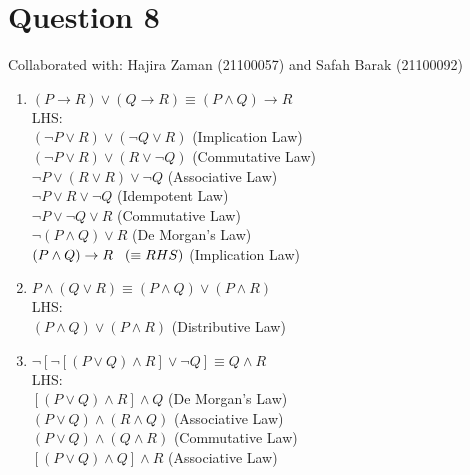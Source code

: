 \documentclass{article}
\begin{document}
\section{Question 8}
Collaborated with: Hajira Zaman (21100057) and Safah Barak (21100092)
\begin{enumerate}
\item %
$(P \rightarrow R) \vee (Q \rightarrow R) \equiv (P\wedge Q) \rightarrow R$ \\
LHS: \\
$(\lnot P \vee R) \vee (\lnot Q \vee R)$ \hspace{10mm} (Implication Law) \\
$(\lnot P \vee R) \vee (R \vee \lnot Q )$ \hspace{10mm} (Commutative Law)\\
$\lnot P \vee ( R \vee R) \vee \lnot Q$ \hspace{13mm} (Associative Law)\\
$\lnot P \vee  R  \vee \lnot Q$ \hspace{22mm} (Idempotent Law)\\
$\lnot P  \vee \lnot Q \vee R$ \hspace{22mm} (Commutative Law)\\
$\lnot (P \wedge  Q) \vee R$ \hspace{22mm} (De Morgan's Law)\\
$ (P \wedge  Q) \rightarrow R \hspace{3mm} (\equiv RHS)$ \hspace{5mm} (Implication Law)
\item %
$P \wedge (Q \vee R) \equiv (P \wedge Q) \vee (P \wedge R)$ \\
LHS: \\
$(P \wedge Q) \vee (P \wedge R)$ \hspace{15mm}(Distributive Law)
\item %
$\lnot [\lnot [(P\vee Q) \wedge R] \vee \lnot Q]  \equiv Q \wedge R$ \\
LHS: \\
$[(P \vee Q) \wedge R] \wedge Q $ \hspace{15mm} (De Morgan's Law) \\
$(P \vee Q) \wedge (R \wedge Q) $ \hspace{14mm} (Associative Law) \\
$(P \vee Q) \wedge (Q \wedge R) $ \hspace{14mm} (Commutative Law) \\
$[(P \vee Q) \wedge Q] \wedge R $ \hspace{15mm} (Associative Law) \\

\end{enumerate}
\end{document}
